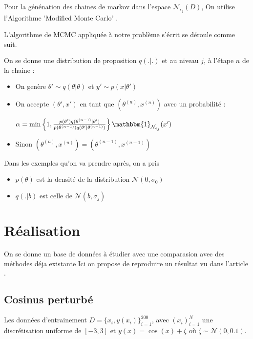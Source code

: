 \documentclass[french,12pt]{article}
\begin{document}

Pour la génénation des chaines de markov dans l'espace $\mathcal{N}_{\epsilon_{j}} (D)$, On utilise l'Algorithme
'Modified Monte Carlo' \cite{Chiachio2014, Modified_MCMC}.

L'algorithme de MCMC \cite{Andrieu2003} appliquée à notre problème s'écrit se déroule comme suit.

On se donne une distribution de proposition $q(.|.)$ et au niveau $j$, à l'étape $n$ de la chaine :

\begin{itemize}
    \item On genère $\theta' \sim q(\theta | \theta)$ et $y' \sim p(x | \theta')$
    \item On accepte $(\theta', x')$ en tant que $(\theta^{(n)}, x^{(n)})$ avec un probabilité :

          $\alpha = \min \left\{ 1, \frac{p(\theta') q(\theta^{(n - 1)} | \theta')}{p(\theta^{(n - 1)}) q(\theta' | \theta^{(n-1)})}\right\}\mathbbm{1}_{\mathcal{N}_{\epsilon_j}} (x')$

    \item Sinon $(\theta^{(n)}, x^{(n)}) = (\theta^{(n-1)}, x^{(n-1)})$
\end{itemize}


Dans les exemples qu'on va prendre après, on a pris
\begin{itemize}
    \item $p(\theta)$ est la densité de la distribution $\mathcal{N}(0, \sigma_0)$
    \item $q(. | b)$ est celle de $ \mathcal{N}(b, \sigma_j)$
\end{itemize}



\pagebreak
\section{Réalisation}
On se donne un base de données à étudier avec une comparasion avec des méthodes déja existante \cite{Chiachio2014,Fernndez2022,Uncertainty_Deep}
Ici on propose de reproduire un résultat vu dans l'article \cite{Fernndez2022}.

\subsection{Cosinus perturbé}

Les données d'entrainement $D = \{x_i , y(x_i)\}_{i = 1}^{200}$, avec $(x_i)_{i = 1}^N$
une discrétisation uniforme de $[-3, 3]$ et $y(x) = \cos(x) + \zeta$ où $\zeta \sim \mathcal{N}(0, 0.1)$.
\end{document}

